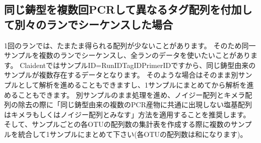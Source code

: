 \documentclass[titlepage,10pt,a4paper,english]{jsbook}
\begin{document}
\subsection{同じ鋳型を複数回PCRして異なるタグ配列を付加して別々のランでシーケンスした場合}

1回のランでは、たまたま得られる配列が少ないことがあります。
そのため同一サンプルを複数のランでシーケンスし、全ランのデータを使いたいことがあります。
ClaidentではサンプルID=RunID{\textunderscore}{\textunderscore}TagID{\textunderscore}{\textunderscore}PrimerIDですから、同じ鋳型由来のサンプルが複数存在するデータとなります。
そのような場合はそのまま別サンプルとして解析を進めることもできますし、1サンプルにまとめてから解析を進めることもできます。
別サンプルのまま処理を進め、ノイジー配列とキメラ配列の除去の際に「同じ鋳型由来の複数のPCR産物に共通に出現しない塩基配列はキメラもしくはノイジー配列とみなす」方法を適用することを推奨します。
そして、サンプルごとの各OTUの配列数の集計表を作成する際に複数のサンプルを統合して1サンプルにまとめて下さい(各OTUの配列数は和になります)。
\end{document}
